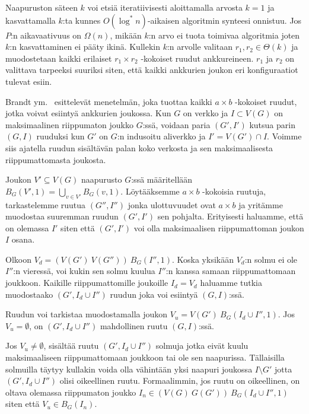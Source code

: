\documentclass[12pt,finnish]{tktltiki2}
\theoremstyle{definition}
\theoremstyle{remark}
\begin{document}
Naapuruston säteen $k$ voi etsiä iteratiivisesti aloittamalla arvosta $k = 1$ ja kasvattamalla $k$:ta kunnes $O(\log^* n)$-aikaisen algoritmin synteesi onnistuu. Jos $P$:n aikavaativuus on $\Omega(n)$, mikään $k$:n arvo ei tuota toimivaa algoritmia joten $k$:n kasvattaminen ei pääty ikinä. Kullekin $k$:n arvolle valitaan $r_1, r_2 \in \Theta(k)$ ja muodostetaan kaikki erilaiset $r_1 \times r_2$ -kokoiset ruudut ankkureineen. $r_1$ ja $r_2$ on valittava tarpeeksi suuriksi siten, että kaikki ankkurien joukon eri konfiguraatiot tulevat esiin.

Brandt ym.~\cite{brandt} esittelevät menetelmän, joka tuottaa kaikki $a \times b$ -kokoiset ruudut, jotka voivat esiintyä ankkurien joukossa. Kun $G$ on verkko ja $I \subset V(G)$ on maksimaalinen riippumaton joukko $G$:ssä, voidaan paria $(G', I')$ kutsua parin $(G, I)$ ruuduksi kun $G'$ on $G$:n indusoitu aliverkko ja $I' = V(G') \cap I$. Voimme siis ajatella ruudun sisältävän palan koko verkosta ja sen maksimaalisesta riippumattomasta joukosta.

Joukon $V' \subseteq V(G)$ naapurusto $G$:ssä määritellään $B_G(V', 1) = \bigcup_{v \in V'} B_G(v, 1)$. Löytääksemme $a \times b$ -kokoisia ruutuja, tarkastelemme ruutua $(G'', I'')$ jonka ulottuvuudet ovat $a \times b$ ja yritämme muodostaa suuremman ruudun $(G', I')$ sen pohjalta. Erityisesti haluamme, että on olemassa $I'$ siten että $(G', I')$ voi olla maksimaalisen riippumattoman joukon $I$ osana.

Olkoon $V_d = (V(G') \ V(G'')) \ B_G(I'', 1)$. Koska yksikään $V_d$:n solmu ei ole $I''$:n vieressä, voi kukin sen solmu kuulua $I''$:n kanssa samaan riippumattomaan joukkoon. Kaikille riippumattomille joukoille $I_d = V_d$ haluamme tutkia muodostaako $(G', I_d \cup I'')$ ruudun joka voi esiintyä $(G, I)$:ssä.

Ruudun voi tarkistaa muodostamalla joukon $V_u = V(G') \ B_G(I_d \cup I'', 1)$. Jos $V_u = \emptyset$, on $(G', I_d \cup I'')$ mahdollinen ruutu $(G, I)$:ssä.

Jos $V_u \neq \emptyset$, sisältää ruutu $(G', I_d \cup I'')$ solmuja jotka eivät kuulu maksimaaliseen riippumattomaan joukkoon tai ole sen naapurissa. Tällaisilla solmuilla täytyy kullakin voida olla vähintään yksi naapuri joukossa $I \setminus G'$ jotta $(G', I_d \cup I'')$ olisi oikeellinen ruutu. Formaalimmin, jos ruutu on oikeellinen, on oltava olemassa riippumaton joukko $I_n \in (V(G) \ G(G')) \ B_G(I_d \cup I'', 1)$ siten että $V_u \in B_G(I_n)$.
\end{document}
